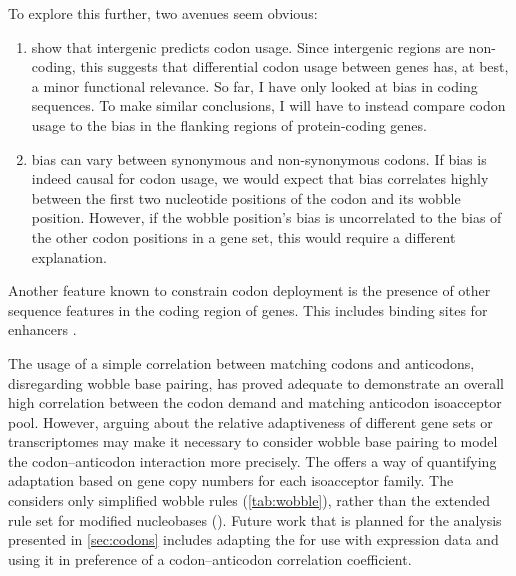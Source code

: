 To explore this further, two avenues seem obvious:

\begin{enumerate}
    \item \citet{Chen:2004} show that intergenic \gc predicts codon usage. Since
        intergenic regions are non-coding, this suggests that differential codon
        usage between genes has, at best, a minor functional relevance. So far,
        I have only looked at \gc bias in coding sequences. To make similar
        conclusions, I will have to instead compare codon usage to the \gc bias
        in the flanking regions of protein-coding genes.
    \item \gc bias can vary between synonymous and non-synonymous codons. If \gc
        bias is indeed causal for codon usage, we would expect that \gc bias
        correlates highly between the first two nucleotide positions of the
        codon and its wobble position. However, if the wobble position’s \gc
        bias is uncorrelated to the \gc bias of the other codon positions in a
        gene set, this would require a different explanation.
\end{enumerate}

Another feature known to constrain codon deployment is the presence of other
sequence features in the coding region of genes. This includes binding sites for
enhancers \citep{Blencowe:2000}.


The usage of a simple correlation between matching codons and anticodons,
disregarding wobble base pairing, has proved adequate to demonstrate an overall
high correlation between the codon demand and matching \trna anticodon
isoacceptor pool. However, arguing about the relative adaptiveness of different
gene sets or transcriptomes may make it  necessary to consider wobble base
pairing to model the codon--anticodon interaction more precisely. The \tai
\citep{Dos_Reis:2003} offers a way of quantifying \trna adaptation based on
\trna gene copy numbers for each isoacceptor family. The \tai considers only
simplified wobble rules (\cref{tab:wobble}), rather than the extended rule set
for modified nucleobases (\citep{Murphy:2004}). Future work that is planned for
the analysis presented in \cref{sec:codons} includes adapting the \tai for use
with \trna expression data and using it in preference of a codon--anticodon
correlation coefficient.
